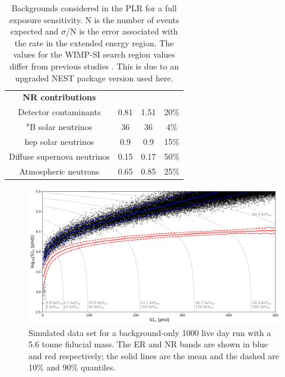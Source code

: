 \begin{table}[]
\begin{tabular}{c|c|c|c}
        \textbf{NR contributions}                    &                        &                         &   \\
        Detector contaminants                        & 0.81                   & 1.51                    & 20\% \cite{LZ_projected_sensitivity_paper_ref}         \\
        ${}^{8}$B solar neutrinos                    & 36                     & 36                      & 4\%  \cite{b8_neutrino_rate_ref}       \\
        hep solar neutrinos                          & 0.9                    & 0.9                     & 15\% \cite{solar_neutrinos_rate_ref, pp_solar_neutrinos_rate_ref}        \\
        Diffuse supernova neutrinos                  & 0.15                   & 0.17                    & 50\% \cite{dissuse_supernova_neutrinos_rate_ref}        \\
        Atmospheric neutrons                         & 0.65                   & 0.85                    & 25\% \cite{atmospheric_neutrinos_rate_ref}      
    \end{tabular}
    \caption{Backgrounds considered in the PLR for a full exposure sensitivity. N is the number of events expected and $\sigma$/N is the error associated with the rate in the extended energy region.
    The values for the WIMP-SI search region values differ from previous studies \cite{LZ_projected_sensitivity_paper_ref,LZ_Ibles_LZStats_Thesis_ref}. This is due to an upgraded NEST package version used here.}
    \label{tab:projected_lz_backgrounds}
\end{table}



\begin{figure}
    \centering
    \includegraphics[width=15cm]{Figures/EFT/Projected_backgrounds/projected_backgrounds_s1_s2.png}
    \caption{Simulated data set for a background-only 1000 live day run with a 5.6 tonne fiducial mass. The ER and NR bands are shown in blue and red respectively; the solid lines are the mean and the dashed are 10\% and 90\% quantiles.}
    \label{fig:projected_background_dataset}
\end{figure}

